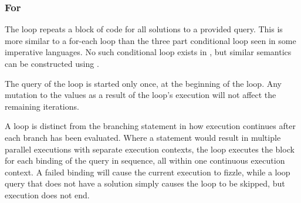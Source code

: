 \subsubsection{For}

The  loop repeats a block of code for all solutions to a provided query.
This is more similar to a for-each loop than the three part conditional loop seen in
some imperative languages. No such conditional  loop exists in \Trilogy{},
but similar semantics can be constructed using .

\begin{bnf*}
\end{bnf*}

The query of the  loop is started only once, at the beginning of the loop.
Any mutation to the values as a result of the loop's execution will not affect the
remaining iterations.

\begin{prooftree}
\end{prooftree}

\begin{prooftree}
\end{prooftree}

A  loop is distinct from the branching  statement in how execution
continues after each branch has been evaluated. Where a  statement would
result in multiple parallel executions with separate execution contexts, the
 loop executes the block for each binding of the query in sequence,
all within one continuous execution context. A failed  binding will cause
the current execution to fizzle, while a  loop query that does not
have a solution simply causes the loop to be skipped, but execution does not end.
